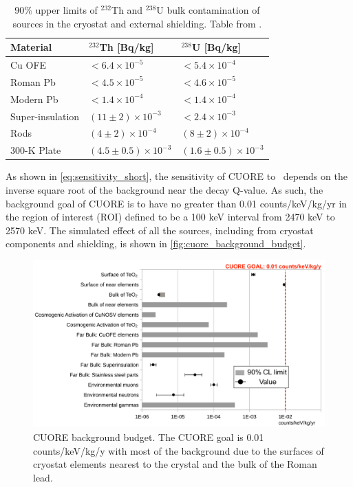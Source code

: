 \begin{table}[htbp]
\centering
\caption[90\% upper limits of $^{232}$Th and $^{238}$U bulk contamination of sources in the cryostat and external shielding.]
{90\% upper limits of $^{232}$Th and $^{238}$U bulk contamination of sources in the cryostat and external shielding.
Table from \cite{Alduino:2017qet}.}
\label{tab:FarDetectorSources_Bulk}
\begin{tabular}{lll}
\hline
\hline
Material         & $^{232}$Th [Bq/kg]         & $^{238}$U [Bq/kg]    \\
\hline
Cu OFE             & $<6.4\times10^{-5}$ & $<5.4\times10^{-4}$      \\
Roman Pb            & $<4.5\times10^{-5}$ & $<4.6\times10^{-5}$      \\
Modern Pb            & $<1.4\times10^{-4}$ & $<1.4\times10^{-4}$      \\
Super-insulation  & $(11\pm2)\times10^{-3}$ & $<2.4\times10^{-3}$      \\
Rods  & $(4\pm2)\times10^{-4}$ & $(8\pm2)\times10^{-4}$      \\
300-K Plate & $(4.5\pm0.5)\times10^{-3}$ & $(1.6\pm0.5)\times10^{-3}$      \\
\hline
\hline
\end{tabular}
\end{table}

As shown in \autoref{eq:sensitivity_short}, the sensitivity of CUORE to \zeronubb~depends on the inverse square root of the background near the decay Q-value.
As such, the background goal of CUORE is to have no greater than 0.01 counts/keV/kg/yr in the region of interest (ROI) defined to be a 100 keV interval from 2470 keV to 2570 keV.
The simulated effect of all the sources, including from cryostat components and shielding, is shown in \autoref{fig:cuore_background_budget}.

\begin{figure}[htbp]
\centering
\includegraphics[width=0.8\linewidth]{Figures/CUORE_background_budget}
\caption[CUORE background budget.]
{CUORE background budget.
The CUORE goal is 0.01 counts/keV/kg/y with most of the background due to the surfaces of cryostat elements nearest to the crystal and the bulk of the Roman lead.}
\label{fig:cuore_background_budget}
\end{figure}